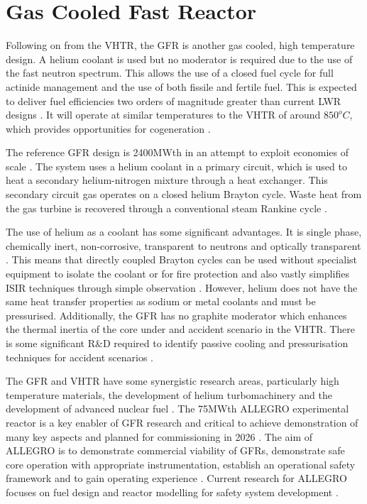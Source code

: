 \documentclass[journal]{IEEEtran}
\begin{document}
\section{Gas Cooled Fast Reactor}
Following on from the VHTR, the GFR is another gas cooled, high temperature design.
A helium coolant is used but no moderator is required due to the use of the fast neutron spectrum.
This allows the use of a closed fuel cycle for full actinide management and the use of both fissile and fertile fuel.
This is expected to deliver fuel efficiencies two orders of magnitude greater than current LWR designs \cite{GenIVRoadmap}.
It will operate at similar temperatures to the VHTR of around $850^oC$, which provides opportunities for cogeneration \cite{Bhatnagar2011}.

The reference GFR design is 2400MWth in an attempt to exploit economies of scale \cite{Locatelli2013}.
The system uses a helium coolant in a primary circuit, which is used to heat a secondary helium-nitrogen mixture through a heat exchanger.
This secondary circuit gas operates on a closed helium Brayton cycle.
Waste heat from the gas turbine is recovered through a conventional steam Rankine cycle \cite{GenIVForum}.

The use of helium as a coolant has some significant advantages.
It is single phase, chemically inert, non-corrosive, transparent to neutrons and optically transparent \cite{Int2012}.
This means that directly coupled Brayton cycles can be used without specialist equipment to isolate the coolant or for fire protection and also vastly simplifies ISIR techniques through simple observation \cite{Locatelli2013}.
However, helium does not have the same heat transfer properties as sodium or metal coolants and must be pressurised.
Additionally, the GFR has no graphite moderator which enhances the thermal inertia of the core under and accident scenario in the VHTR.
There is some significant R\&D required to identify passive cooling and pressurisation techniques for accident scenarios \cite{Int2012}.

The GFR and VHTR have some synergistic research areas, particularly high temperature materials, the development of helium turbomachinery and the development of advanced nuclear fuel \cite{Locatelli2013}. 
The 75MWth ALLEGRO experimental reactor is a key enabler of GFR research and critical to achieve demonstration of many key aspects \cite{Int2012} and planned for commissioning in 2026 \cite{Locatelli2013}.
The aim of ALLEGRO is to demonstrate commercial viability of GFRs, demonstrate safe core operation with appropriate instrumentation, establish an operational safety framework and to gain operating experience \cite{Int2012}.
Current research for ALLEGRO focuses on fuel design and reactor modelling for safety system development \cite{GenIVForum}.
\end{document}
